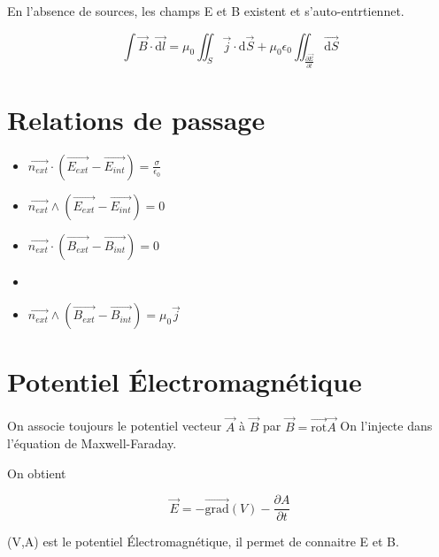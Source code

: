 \documentclass[french]{yLectureNote}
\renewcommand{\vec}{\overrightarrow}
\newcommand{\dd}{\mathrm{d}}
\newcommand{\rot}{\vec{\mathrm{rot}}}
\newcommand{\grad}{\vec{\mathrm{grad}}}
\begin{document}
En l'absence de sources, les champs E et B existent et s'auto-entrtiennet.
\begin{theorem}
   $$\int\vec{B}\cdot \vec{\dd l} = \mu_0 \iint_S \vec{j}\cdot \dd \vec{S}+\mu_0\epsilon_0 \iint_ \frac{\partial \vec{E}}{\partial t}\vec{\dd S}$$ 
\end{theorem}
\section{Relations de passage}
\begin{itemize}
    \item $\vec{n_{ext}}\cdot (\vec{E_{ext}}-\vec{E_{int}}) = \frac{\sigma}{\epsilon_0}$
    \item $\vec{n_{ext}}\wedge (\vec{E_{ext}}-\vec{E_{int}}) = 0$
    \item $\vec{n_{ext}}\cdot (\vec{B_{ext}}-\vec{B_{int}}) = 0$
    \item \item $\vec{n_{ext}}\wedge (\vec{B_{ext}}-\vec{B_{int}}) = \mu_0\vec{j}$
\end{itemize}
\section{Potentiel Électromagnétique}
On associe toujours le potentiel vecteur $\vec{A}$ à $\vec{B}$ par $\vec{B} = \rot\vec{A}$ On 
l'injecte dans l'équation de Maxwell-Faraday.

On obtient 
\begin{theorem}
    $$\vec{E} = -\grad(V)-\frac{\partial A}{\partial t}$$
\end{theorem}
(V,A) est le potentiel Électromagnétique, il permet de connaitre E et B.
\end{document}
